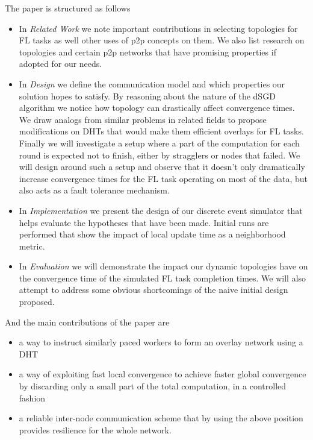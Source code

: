 \documentclass[12pt,notitlepage]{article}
\begin{document}
The paper is structured as follows
\begin{itemize}
\item In {\it Related Work} we note important contributions in selecting 
topologies for FL tasks as well other uses of p2p concepts on them.
We also list research on topologies and certain p2p networks that have 
promising properties if adopted for our needs.

\item In {\it Design} we define the communication model and which properties
our solution hopes to satisfy. By reasoning about the nature of the dSGD 
algorithm we notice how topology can drastically affect convergence times.
We draw analogs from similar problems in related fields to propose 
modifications on DHTs that would make them efficient overlays for FL tasks. 
Finally we will investigate a setup where a part of the computation for
each round is expected not to finish, either by stragglers or nodes that
failed. We will design around such a setup and observe that it doesn't 
only dramatically increase convergence times for the FL task operating on 
most of the data, but also acts as a fault tolerance mechanism.

\item In {\it Implementation} we present the design of our discrete event
simulator that helps evaluate the hypotheses that have been made. Initial
runs are performed that show the impact of local update time as a neighborhood
metric.

\item In {\it Evaluation} we will demonstrate the impact our dynamic topologies
have on the convergence time of the simulated FL task completion times. We 
will also  attempt to address some obvious shortcomings of the naive initial 
design proposed.
\end{itemize}
And the main contributions of the paper are
\begin{itemize}
\item a way to instruct similarly paced workers to form an overlay network using a DHT
\item a way of exploiting fast local convergence to achieve faster global convergence by discarding
      only a small part of the total computation, in a controlled fashion
\item a reliable inter-node communication scheme that by using the above position provides resilience
      for the whole network.
\end{itemize}
\end{document}
